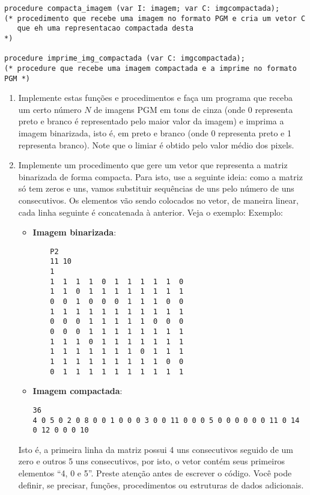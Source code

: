 \begin{enumerate}
\begin{lstlisting}
procedure compacta_imagem (var I: imagem; var C: imgcompactada);
(* procedimento que recebe uma imagem no formato PGM e cria um vetor C
   que eh uma representacao compactada desta                           *)

procedure imprime_img_compactada (var C: imgcompactada);
(* procedure que recebe uma imagem compactada e a imprime no formato PGM *)
\end{lstlisting}

\begin {enumerate}

\item  Implemente estas funções e procedimentos e faça um programa que 
receba um certo número $N$ de imagens PGM em tons de cinza (onde 0
representa preto e branco é representado pelo maior valor da imagem) e
imprima a imagem binarizada, isto é, em preto e branco (onde 0 
representa preto e 1 representa branco). Note que o limiar é obtido
pelo valor médio dos pixels.

\item 
Implemente um procedimento que gere um vetor que representa a matriz 
binarizada de forma compacta. Para isto, use a seguinte ideia: como a
matriz só tem zeros e uns, vamos substituir sequências de uns pelo número
de uns consecutivos. Os elementos vão sendo colocados no vetor, de maneira
linear, cada linha seguinte é concatenada à anterior. Veja o exemplo:
Exemplo:
\begin{itemize}
\vspace*{-2mm}      
    \item \textbf{Imagem binarizada}:
    \begin{verbatim}
    P2
    11 10
    1
    1  1  1  1  0  1  1  1  1  1  0 
    1  1  0  1  1  1  1  1  1  1  1 
    0  0  1  0  0  0  1  1  1  0  0
    1  1  1  1  1  1  1  1  1  1  1
    0  0  0  1  1  1  1  1  0  0  0
    0  0  0  1  1  1  1  1  1  1  1
    1  1  1  0  1  1  1  1  1  1  1
    1  1  1  1  1  1  1  0  1  1  1
    1  1  1  1  1  1  1  1  1  0  0
    0  1  1  1  1  1  1  1  1  1  1
    \end{verbatim}

\vspace*{-4mm}      
    \item \textbf{Imagem compactada}:
    \begin{verbatim}
36
4 0 5 0 2 0 8 0 0 1 0 0 0 3 0 0 11 0 0 0 5 0 0 0 0 0 0 11 0 14 0 12 0 0 0 10
\end{verbatim}
\end{itemize}

Isto é, a primeira linha da matriz possui 4 uns consecutivos seguido de um
zero e outros 5 uns consecutivos, por isto, o vetor contém seus primeiros
elementos ``4, 0 e 5''. Preste atenção antes de escrever o código. Você pode 
definir, se precisar, funções, procedimentos ou estruturas de dados adicionais.
\end{enumerate}



\end{enumerate}
